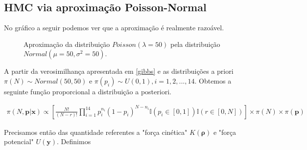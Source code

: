 \documentclass[a4paper,12pt,twoside]{article}
\begin{document}
\subsection{HMC via aproximação Poisson-Normal}

No gráfico a seguir podemos ver que a aproximação é realmente razoável.
\begin{figure}[H]
  \centering

  \captionsetup{font=footnotesize,width=15cm}
  \caption{\small Aproximação da distribuição $Poisson(\lambda=50)$ pela distribuição $Normal(\mu=50,\sigma^2=50)$.}
\end{figure}

A partir da verosimilhança apresentada em \ref{gibbs} e as distribuições a priori $\pi(N)\sim Normal(50,50)$ e $\pi(p_i)\sim U(0,1),i=1,2,...,14$. Obtemos a seguinte função proporcional a distribuição a posteriori.

\begin{align*}
\pi(N,\mathbf{p|x})\propto \left[\frac{N!}{(N-r)!}\prod_{i=1}^{14}p_{i}^{n_i}(1-p_i)^{N-n_i}\mathds{I}(p_i \in [0,1])\mathds{I}(r \in [0,N])\right] \times \pi(N) \times \pi(\mathbf{p}) 
\end{align*}

Precisamos então das quantidade referentes a "força cinética" $K(\bm{\rho})$ e "força potencial" $U(\mathbf{y})$. Definimos 
\end{document}
